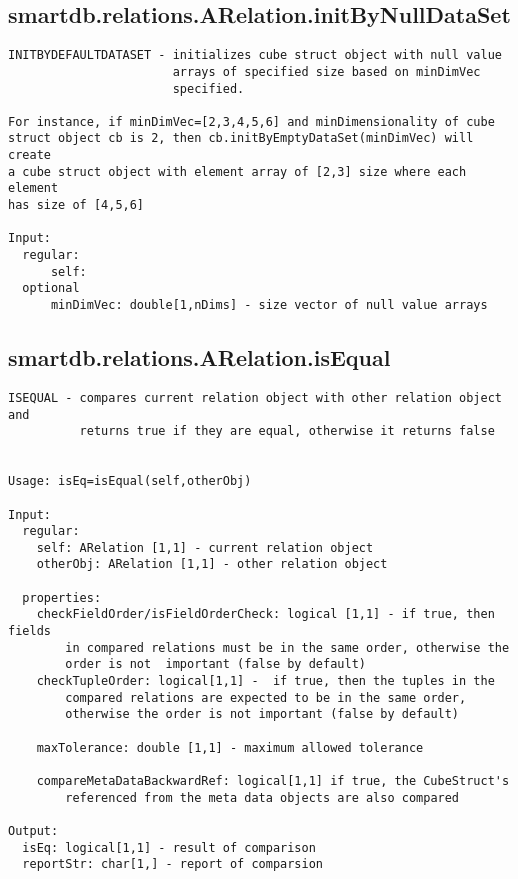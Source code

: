 \subsection{\texorpdfstring{smartdb.relations.ARelation.initByNullDataSet}{initByNullDataSet}}\label{method:smartdb.relations.ARelation.initByNullDataSet}
\begin{verbatim}
INITBYDEFAULTDATASET - initializes cube struct object with null value
                       arrays of specified size based on minDimVec
                       specified.

For instance, if minDimVec=[2,3,4,5,6] and minDimensionality of cube
struct object cb is 2, then cb.initByEmptyDataSet(minDimVec) will create
a cube struct object with element array of [2,3] size where each element
has size of [4,5,6]

Input:
  regular:
      self:
  optional
      minDimVec: double[1,nDims] - size vector of null value arrays
\end{verbatim}
\subsection{\texorpdfstring{smartdb.relations.ARelation.isEqual}{isEqual}}\label{method:smartdb.relations.ARelation.isEqual}
\begin{verbatim}
ISEQUAL - compares current relation object with other relation object and
          returns true if they are equal, otherwise it returns false


Usage: isEq=isEqual(self,otherObj)

Input:
  regular:
    self: ARelation [1,1] - current relation object
    otherObj: ARelation [1,1] - other relation object

  properties:
    checkFieldOrder/isFieldOrderCheck: logical [1,1] - if true, then fields
        in compared relations must be in the same order, otherwise the
        order is not  important (false by default)
    checkTupleOrder: logical[1,1] -  if true, then the tuples in the
        compared relations are expected to be in the same order,
        otherwise the order is not important (false by default)

    maxTolerance: double [1,1] - maximum allowed tolerance

    compareMetaDataBackwardRef: logical[1,1] if true, the CubeStruct's
        referenced from the meta data objects are also compared

Output:
  isEq: logical[1,1] - result of comparison
  reportStr: char[1,] - report of comparsion
\end{verbatim}
